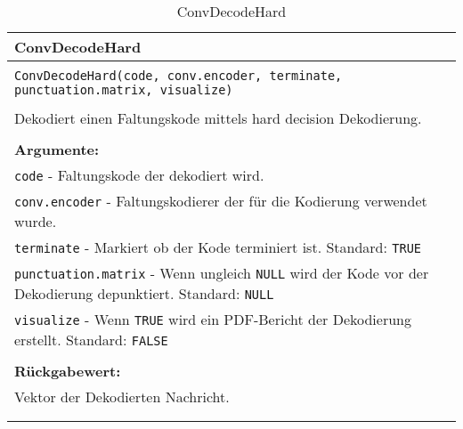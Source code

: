 \begin{longtable}{|p{\textwidth}|}
\hline
\rowcolor{lightblue}
ConvDecodeHard
\\
\hline
\\
\texttt{ConvDecodeHard(code, conv.encoder, terminate, punctuation.matrix, visualize)}\\
\\
Dekodiert einen Faltungskode mittels hard decision Dekodierung.\\
\\
\textbf{Argumente:}\\
\texttt{code} - Faltungskode der dekodiert wird.\\
\texttt{conv.encoder} - Faltungskodierer der für die Kodierung verwendet wurde.\\
\texttt{terminate} - Markiert ob der Kode terminiert ist. Standard: \texttt{TRUE}\\
\texttt{punctuation.matrix} - Wenn ungleich \texttt{NULL} wird der Kode vor der Dekodierung depunktiert. Standard: \texttt{NULL}\\
\texttt{visualize} - Wenn \texttt{TRUE} wird ein PDF-Bericht der Dekodierung erstellt. Standard: \texttt{FALSE}\\
\\
\textbf{Rückgabewert:}\\
Vektor der Dekodierten Nachricht.\\
\\
\hline
\caption{ConvDecodeHard}
\end{longtable}